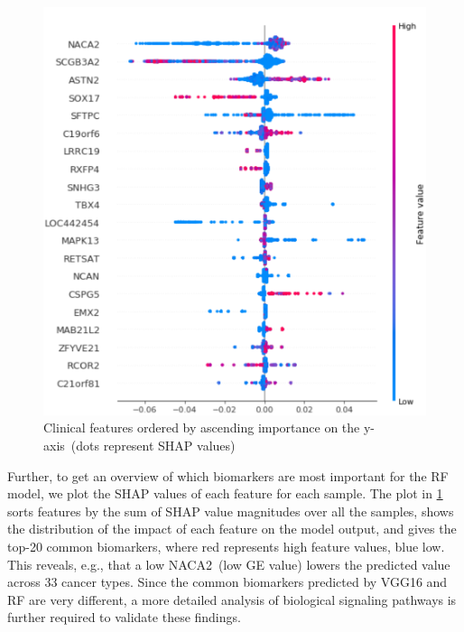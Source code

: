 \begin{figure}[h]
\centering
	\includegraphics[scale=0.8]{images/fi.png}
	\caption{Clinical features ordered by ascending importance on the y-axis~(dots represent SHAP values)} 
	\label{fig:shap_FI}
	\vspace{-2mm}
\end{figure}

\hspace*{3.5mm} Further, to get an overview of which biomarkers are most important for the RF model, we plot the SHAP values of each feature for each sample. The plot in \cref{fig:shap_FI} sorts features by the sum of SHAP value magnitudes over all the samples, shows the distribution of the impact of each feature on the model output, and gives the top-20 common biomarkers, where red represents high feature values, blue low. This reveals, e.g., that a low NACA2~(low GE value) lowers the predicted value across 33 cancer types. Since the common biomarkers predicted by VGG16 and RF are very different, a more detailed analysis of biological signaling pathways is further required to validate these findings. 

